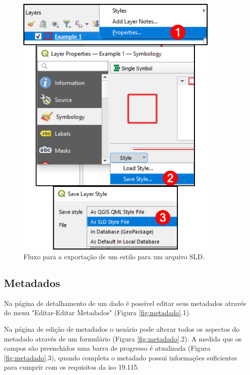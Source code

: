 \documentclass[12pt]{article}
\begin{document}
\begin{figure}[ht]
  \centering
  \includegraphics[width=10cm, keepaspectratio]{img/exportarsld.pdf}
  \caption{Fluxo para a exportação de um estilo para um arquivo SLD.}
  \label{fig:exportarsld}
\end{figure}

\subsection{Metadados}

Na página de detalhamento de um dado é possível editar seus metadados através
do menu "Editar-Editar Metadados" (Figura \ref{fig:metadado}.1). 

Na página de edição de metadados o usuário pode alterar todos os aspectos do
metadado através de um formulário (Figura \ref{fig:metadado}.2). A medida que
os campos são preenchidos uma barra de progresso é atualizada (Figura
\ref{fig:metadado}.3), quando completa o metadado possui informações
suficientes para cumprir com os requisitos da iso 19.115.
\end{document}
